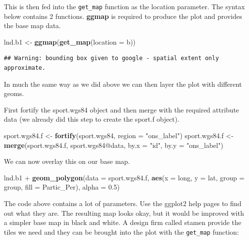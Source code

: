 \documentclass[]{article}
\newenvironment{Shaded}{}{}
\newcommand{\KeywordTok}[1]{\textcolor[rgb]{0.00,0.44,0.13}{\textbf{{#1}}}}
\newcommand{\DataTypeTok}[1]{\textcolor[rgb]{0.56,0.13,0.00}{{#1}}}
\newcommand{\FloatTok}[1]{\textcolor[rgb]{0.25,0.63,0.44}{{#1}}}
\newcommand{\StringTok}[1]{\textcolor[rgb]{0.25,0.44,0.63}{{#1}}}
\newcommand{\NormalTok}[1]{{#1}}
\begin{document}
This is then fed into the \texttt{get\_map} function as the location
parameter. The syntax below contains 2 functions. \textbf{ggmap} is
required to produce the plot and provides the base map data.

\begin{Shaded}
\begin{Highlighting}[]
\NormalTok{lnd.b1 <-}\StringTok{ }\KeywordTok{ggmap}\NormalTok{(}\KeywordTok{get_map}\NormalTok{(}\DataTypeTok{location =} \NormalTok{b))}
\end{Highlighting}
\end{Shaded}

\begin{verbatim}
## Warning: bounding box given to google - spatial extent only approximate.
\end{verbatim}

In much the same way as we did above we can then layer the plot with
different geoms.

First fortify the sport.wgs84 object and then merge with the required
attribute data (we already did this step to create the sport.f object).

\begin{Shaded}
\begin{Highlighting}[]
\NormalTok{sport.wgs84.f <-}\StringTok{ }\KeywordTok{fortify}\NormalTok{(sport.wgs84, }\DataTypeTok{region =} \StringTok{"ons_label"}\NormalTok{)}
\NormalTok{sport.wgs84.f <-}\StringTok{ }\KeywordTok{merge}\NormalTok{(sport.wgs84.f, sport.wgs84@data, }\DataTypeTok{by.x =} \StringTok{"id"}\NormalTok{, }\DataTypeTok{by.y =} \StringTok{"ons_label"}\NormalTok{)}
\end{Highlighting}
\end{Shaded}

We can now overlay this on our base map.

\begin{Shaded}
\begin{Highlighting}[]
\NormalTok{lnd.b1 +}\StringTok{ }\KeywordTok{geom_polygon}\NormalTok{(}\DataTypeTok{data =} \NormalTok{sport.wgs84.f, }\KeywordTok{aes}\NormalTok{(}\DataTypeTok{x =} \NormalTok{long, }\DataTypeTok{y =} \NormalTok{lat, }\DataTypeTok{group =} \NormalTok{group, }
    \DataTypeTok{fill =} \NormalTok{Partic_Per), }\DataTypeTok{alpha =} \FloatTok{0.5}\NormalTok{)}
\end{Highlighting}
\end{Shaded}

The code above contains a lot of parameters. Use the ggplot2 help pages
to find out what they are. The resulting map looks okay, but it would be
improved with a simpler base map in black and white. A design firm
called stamen provide the tiles we need and they can be brought into the
plot with the \texttt{get\_map} function:
\end{document}
